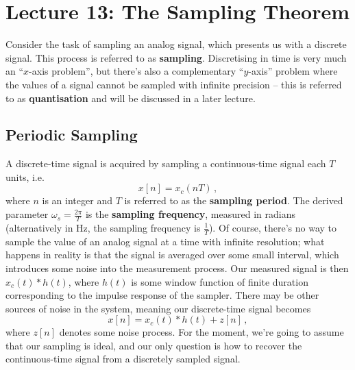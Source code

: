 \section{Lecture 13: The Sampling Theorem}

Consider the task of sampling an analog signal, which presents
us with a discrete signal. This process is referred to as \textbf{sampling}.
Discretising in time is very much an ``$x$-axis problem'', but there's
also a complementary ``$y$-axis'' problem where the values of a signal cannot
be sampled with infinite precision -- this is referred to as
\textbf{quantisation} and will be discussed in a later lecture.

\subsection{Periodic Sampling}
%
A discrete-time signal is acquired by sampling a continuous-time signal
each $T$ units, i.e.
%
\begin{displaymath}
  x[n] = x_c(nT) \,,
\end{displaymath}
%
where $n$ is an integer and $T$ is referred to as the \textbf{sampling period}.
The derived parameter $\omega_s=\frac{2\pi}{T}$ is the
\textbf{sampling frequency}, measured in radians (alternatively in Hz,
the sampling frequency is $\frac{1}{T}$). Of course, there's no way to
sample the value of an analog signal at a time with infinite resolution;
what happens in reality is that the signal is averaged over some small
interval, which introduces some noise into the measurement process. Our
measured signal is then $x_c(t) * h(t)$, where $h(t)$ is some window function
of finite duration corresponding to the impulse response of the sampler.
There may be other sources of noise in the system, meaning our discrete-time
signal becomes
%
\begin{displaymath}
  x[n] = x_c(t) * h(t) + z[n] \,,
\end{displaymath}
%
where $z[n]$ denotes some noise process. For the moment, we're going to
assume that our sampling is ideal, and our only question is how to recover
the continuous-time signal from a discretely sampled signal.

